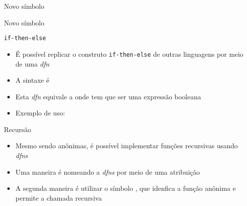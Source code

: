 \begin{frame}[fragile]{Novo símbolo}


\end{frame}

\begin{frame}[fragile]{Novo símbolo}


\end{frame}


\begin{frame}[fragile]{\tt if-then-else}

    \begin{itemize}
        \item É possível replicar o construto \texttt{if-then-else} de outras linguagens por meio de uma \textit{dfn}
        \pause

        \item A sintaxe é
        \pause

        \item Esta \textit{dfn} equivale a 
        onde  tem que ser uma expressão booleana

        \pause

        \item Exemplo de uso:
    \end{itemize}

\end{frame}

\begin{frame}[fragile]{Recursão}

    \begin{itemize}
        \item Mesmo sendo anônimas, é possível implementar funções recursivas usando \textit{dfns}
        \pause

        \item Uma maneira é nomeando a \textit{dfns} por meio de uma atribuição
        \pause

        \item A segunda maneira é utilizar o símbolo , que idenfica a função anônima e permite a chamada recursiva
    \end{itemize}

\end{frame}

